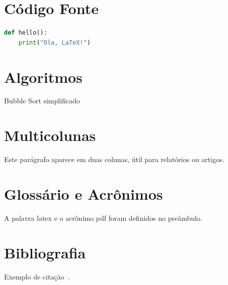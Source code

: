 \documentclass[12pt]{article}
\begin{document}
\section{Código Fonte}
\begin{lstlisting}[language=Python, caption=Exemplo em Python]
def hello():
    print("Ola, LaTeX!")
\end{lstlisting}

\section{Algoritmos}
\begin{algorithm}[H]
\SetAlgoLined
{}
\caption{Bubble Sort simplificado}
\end{algorithm}

\section{Multicolunas}
\begin{multicols}{2}
Este parágrafo aparece em duas colunas, útil para relatórios ou artigos.
\end{multicols}

\section{Glossário e Acrônimos}
A palavra \gls{latex} e o acrônimo \gls{pdf} foram definidos no preâmbulo.

\printglossary[type=\acronymtype]
\printglossary

\section{Bibliografia}
Exemplo de citação~\cite{knuth1984texbook}.

\printbibliography

\clearpage
\printindex
\end{document}
